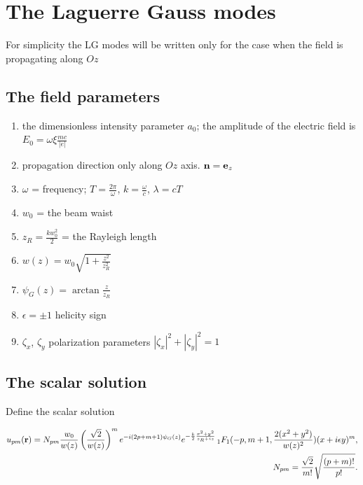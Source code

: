 


\section{The Laguerre Gauss modes}
 {\color{red} For simplicity the LG modes will be written only for the case when the field is propagating along $Oz$}

\subsection{The field parameters}
\begin{enumerate}
    \item the dimensionless intensity parameter $a_0$; the amplitude of the electric field is $E_0 = \omega \xi \frac{mc}{|e|}$
    \item propagation direction only along $Oz$ axis. ${\bf n} ={\bf e}_z$
    \item $\omega$ = frequency; $T=\frac{2\pi}{\omega}$, $k = \frac{\omega}c$, $\lambda= c T$
    \item $w_0$ = the beam waist
    \item $z_R = \frac{kw_0^2}{2}$ = the Rayleigh length
    \item $w(z) = w_0\sqrt{1+\frac{z^2}{z_R^2}}$
    \item $\psi_G(z) = \arctan\frac{z}{z_R}$
    \item $\epsilon=\pm1$ helicity sign
    \item $\zeta_x$, $\zeta_y$ polarization parameters $|\zeta_x|^2 + |\zeta_y|^2=1$
\end{enumerate}
\subsection{The scalar solution}

Define the scalar solution
\begin{importantbox}
    \begin{align}
        u_{pm}({\bf r}) = N_{pm}\frac{w_0}{w(z)}\left(\frac{\sqrt{2}}{w(z)}\right)^me^{-i(2p + m +1)\psi_G(z)}e^{-\frac{k}2\frac{x^2+y^2}{z_R+i z}}\, _1F_1(-p, m+1, \frac{2(x^2+y^2)}{w(z)^2}) (x+i\epsilon y)^m, \\
        N_{pm} = \frac{\sqrt{2}}{m!}\sqrt{\frac{(p+m)!}{p!}}.
    \end{align}
\end{importantbox}

